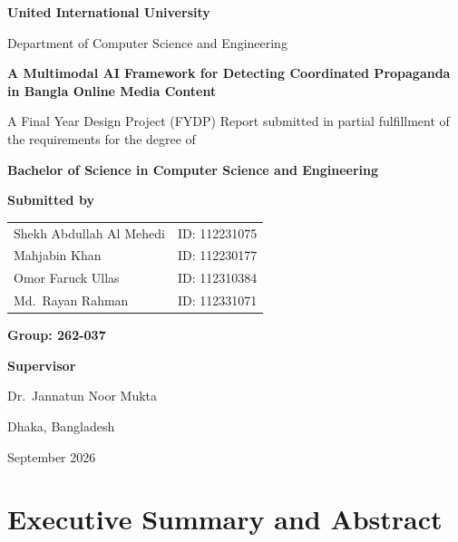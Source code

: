 \documentclass[12pt,a4paper]{report}
\newcommand{\ttl}{A Multimodal AI Framework for Detecting Coordinated Propaganda in Bangla Online Media Content}
\begin{document}
\begin{titlepage}
\thispagestyle{empty}
\centering
{\Large\bfseries\color{uiublue} United International University\par}
\vspace{2pt}
{\large Department of Computer Science and Engineering\par}
\vspace{1.4cm}
{\LARGE\bfseries\color{uiublue}\ttl\par}
\vspace{1.4cm}
{\large A Final Year Design Project (FYDP) Report submitted in partial fulfillment of the
requirements for the degree of\par}
\vspace{6pt}
{\large\bfseries Bachelor of Science in Computer Science and Engineering\par}
\vspace{1.2cm}
{\large\bfseries Submitted by\par}
\vspace{6pt}
\begin{tabular}{l c}
Shekh Abdullah Al Mehedi & ID: 112231075\\[3pt]
Mahjabin Khan & ID: 112230177\\[3pt]
Omor Faruck Ullas & ID: 112310384\\[3pt]
Md.\ Rayan Rahman & ID: 112331071
\end{tabular}
\vspace{1.2cm}

{\large\bfseries Group: 262-037\par}
\vspace{1cm}
{\large\bfseries Supervisor\par}
\vspace{4pt}
{\large Dr.\ Jannatun Noor Mukta\par}
\vfill
{\large Dhaka, Bangladesh\par}
{\large September 2026\par}
\end{titlepage}


\chapter*{Executive Summary and Abstract}
\end{document}
